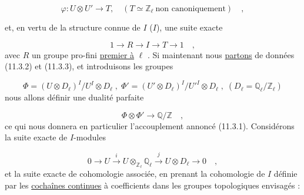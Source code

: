 \begin{equation}\tag{11.3.2}
\varphi : U \otimes U' \longrightarrow T, \quad (T \simeq \mathbb{Z}_\ell \ \text{non canoniquement}) \quad ,
\end{equation}


et, en vertu de la structure connue de $I$ ($I$\hspace{2.5em}), une suite exacte

\begin{equation}\tag{11.3.3}
1 \longrightarrow R \longrightarrow I \longrightarrow T \longrightarrow 1 \quad ,
\end{equation}
avec $R$ un groupe pro-fini \underline{premier à} $\ell$ . Si maintenant nous \underline{partons} de données (11.3.2) et (11.3.3), et introduisons les groupes

\begin{equation}\tag{11.3.4}
\Phi = (U\otimes D_\ell)^I/U^I\otimes D_\ell \;,\; \Phi' = (U'\otimes D_\ell)^I/{U'}^{I}\otimes D_\ell \;,\; (D_\ell = \mathbb{Q}_\ell/\mathbb{Z}_\ell)
\end{equation}
nous allons définir une dualité parfaite

\begin{equation}\tag{11.3.5}
\Phi \otimes \Phi' \longrightarrow \mathbb{Q}/\mathbb{Z} \quad ,
\end{equation}
ce qui nous donnera en particulier l'accouplement annoncé (11.3.1). Considérons la suite exacte de $I$-modules

\begin{equation}\tag{11.3.6}
0 \longrightarrow U \xrightarrow{\ i\ } U\otimes_{\mathbb{Z}_\ell}\mathbb{Q}_\ell \xrightarrow{\ j\ } U\otimes D_\ell \longrightarrow 0 \quad ,
\end{equation}
et la suite exacte de cohomologie associée, en prenant la cohomologie de $I$ définie par les \underline{cochaînes continues} à coefficients dans les groupes topologiques envisagés :


